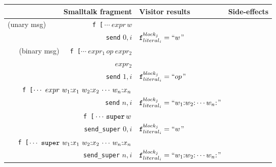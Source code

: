 \documentclass[11pt]{article}
\begin{document}

\def\arraystretch{1.0}

\begin{figure}
\begin{center}
\begin{tabular}[t]{r | l | l }
{\bf Smalltalk fragment} & {\bf Visitor results} & {\bf Side-effects}\\
\hline
(unary msg)~~~~~~~~~~~~\, {\tt f\,[}\,$\cdots ~expr \,w$ &
\begin{minipage}[t]{0.2\linewidth}
$expr$\\
{\tt send} $0,i$\vspace{5pt}
\end{minipage}  & $\text{\tt f}^{block_j}_{literal_i} = ``w$'' \\

(binary msg)~~~{\tt f\,[}$\cdots ~expr_1\, op~ expr_2$ &
\begin{minipage}[t]{0.2\linewidth}
$expr_1$\\
$expr_2$\\
{\tt send} $1,i$\vspace{5pt}
\end{minipage}  & $\text{\tt f}^{block_j}_{literal_i} = ``op$'' \\

{\tt f\,[}$\cdots ~expr ~w_1{\tt :} x_1 ~ w_2{\tt :} x_2 \, \cdots \, w_n{\tt :} x_n$ &
\begin{minipage}[t]{0.2\linewidth}
$expr$\\
{\tt send} $n,i$\vspace{5pt}
\end{minipage}  & $\text{\tt f}^{block_j}_{literal_i} = ``w_1{\tt :}w_2{\tt :}\cdots w_n{\tt :}$'' \\

{\tt f\,[}$\,\cdots \,{\tt super} \,w$ &
\begin{minipage}[t]{0.2\linewidth}
{\tt self}\\
{\tt send\_super} $0,i$\vspace{5pt}
\end{minipage}  & $\text{\tt f}^{block_j}_{literal_i} = ``w$'' \\

{\tt f\,[}$\cdots ~{\tt super} ~w_1{\tt :} x_1 ~ w_2{\tt :} x_2 \, \cdots \, w_n{\tt :} x_n$ &
\begin{minipage}[t]{0.2\linewidth}
$expr$\\
{\tt send\_super} $n,i$\vspace{3pt}
\end{minipage}  & $\text{\tt f}^{block_j}_{literal_i} = ``w_1{\tt :}w_2{\tt :}\cdots w_n{\tt :}$''\\


\end{tabular}
\end{center}
\end{figure}
\end{document}
